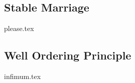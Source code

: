 \documentclass{exam}
\begin{document}
\subsection{Stable Marriage}
\begin{enumerate}
{please.tex}
\end{enumerate}

\subsection{Well Ordering Principle}
\begin{enumerate}
{infimum.tex}
\end{enumerate}

\end{document}

